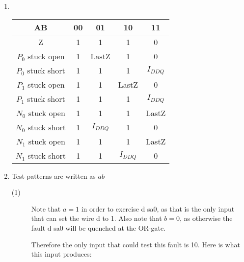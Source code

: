 \documentclass[a4paper,12pt]{article}
\begin{document}
\begin{enumerate}
        \item \mbox{}\\

            \begin{tabular}{|c|c|c|c|c|}
                \hline
                AB                & 00 & 01        & 10        & 11        \\ \hline
                Z                 & 1  & 1         & 1         & 0         \\ \hline
                $P_0$ stuck open  & 1  & LastZ     & 1         & 0         \\ \hline
                $P_0$ stuck short & 1  & 1         & 1         & $I_{DDQ}$ \\ \hline
                $P_1$ stuck open  & 1  & 1         & LastZ     & 0         \\ \hline
                $P_1$ stuck short & 1  & 1         & 1         & $I_{DDQ}$ \\ \hline
                $N_0$ stuck open  & 1  & 1         & 1         & LastZ     \\ \hline
                $N_0$ stuck short & 1  & $I_{DDQ}$ & 1         & 0         \\ \hline
                $N_1$ stuck open  & 1  & 1         & 1         & LastZ     \\ \hline
                $N_1$ stuck short & 1  & 1         & $I_{DDQ}$ & 0         \\ \hline
            \end{tabular}

        \item Test patterns are written as $ab$
            \begin{description}
                \item[(1)] Note that $a = 1$ in order to exercise d sa0, as that is the only input that can set the wire d to 1.
                    Also note that $b = 0$, as otherwise the fault d sa0 will be quenched at the OR-gate.

                    Therefore the only input that could test this fault is 10. Here is what this input produces:


\end{description}
\end{enumerate}
\end{document}
